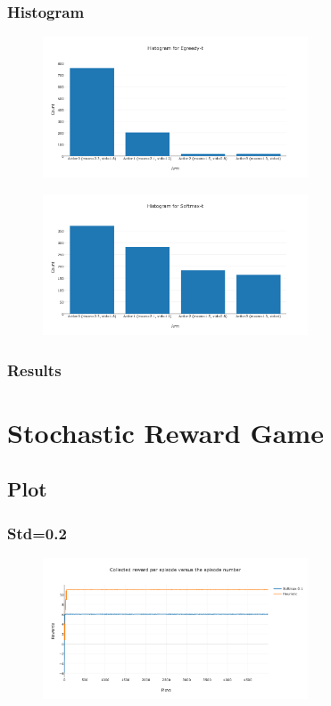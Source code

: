 \documentclass[11pt]{article}
\begin{document}
\subsubsection{Histogram}

\begin{figure}[H]
   \centering
   \includegraphics[width=0.7\textwidth]{img/1-3/h1.png}
\end{figure}

\begin{figure}[H]
   \centering
   \includegraphics[width=0.7\textwidth]{img/1-3/h2.png}
\end{figure}


\subsubsection{Results}


\section{Stochastic Reward Game}


\subsection{Plot}

\subsubsection{Std=0.2}

\begin{figure}[H]
   \centering
   \includegraphics[width=0.7\textwidth]{img/2/1.png}
\end{figure}
\end{document}
